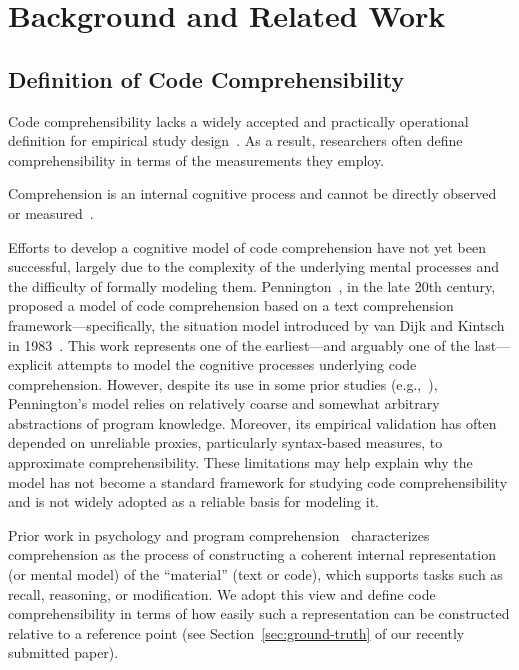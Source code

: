 \section{Background and Related Work}
\label{sec:relatedworkMain}

\subsection{Definition of Code Comprehensibility}
\label{sec:main-def}

Code comprehensibility lacks a widely accepted and practically operational definition for empirical study design~\cite{Wyrich:ACS23}. As a result, researchers often define comprehensibility in terms of the measurements they employ.

Comprehension is an internal cognitive process and cannot be directly observed or measured~\cite{f1}.

Efforts to develop a cognitive model of code comprehension have not yet been successful, largely due to the complexity of the underlying mental processes and the difficulty of formally modeling them. Pennington~\cite{penningtonModel}, in the late 20th century, proposed a model of code comprehension based on a text comprehension framework—specifically, the situation model introduced by van Dijk and Kintsch in 1983~\cite{textmodel}. This work represents one of the earliest—and arguably one of the last—explicit attempts to model the cognitive processes underlying code comprehension. However, despite its use in some prior studies (e.g.,~\cite{lyu2025effects, mannes2024van}), Pennington’s model relies on relatively coarse and somewhat arbitrary abstractions of program knowledge. Moreover, its empirical validation has often depended on unreliable proxies, particularly syntax-based measures, to approximate comprehensibility. These limitations may help explain why the model has not become a standard framework for studying code comprehensibility and is not widely adopted as a reliable basis for modeling it.

Prior work in psychology and program comprehension~\cite{penningtonModel,f1,f2,f3,f4} characterizes comprehension as the process of constructing a coherent internal representation (or mental model) of the “material” (\eg text or code), which supports tasks such as recall, reasoning, or modification.
%
We adopt this view and define code comprehensibility in terms of how easily such a representation can be constructed relative to a reference point (see Section~\ref{sec:ground-truth} of our recently submitted paper).

